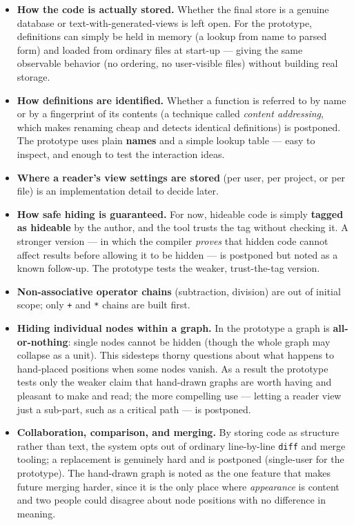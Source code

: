 \documentclass[11pt]{article}
\begin{document}
\begin{deferbox}
\begin{itemize}[leftmargin=1.4em,itemsep=4pt]
  \item \textbf{How the code is actually stored.} Whether the final store is a genuine database or text-with-generated-views is left open. For the prototype, definitions can simply be held in memory (a lookup from name to parsed form) and loaded from ordinary files at start-up --- giving the same observable behavior (no ordering, no user-visible files) without building real storage.
  \item \textbf{How definitions are identified.} Whether a function is referred to by name or by a fingerprint of its contents (a technique called \emph{content addressing}, which makes renaming cheap and detects identical definitions) is postponed. The prototype uses plain \textbf{names} and a simple lookup table --- easy to inspect, and enough to test the interaction ideas.
  \item \textbf{Where a reader's view settings are stored} (per user, per project, or per file) is an implementation detail to decide later.
  \item \textbf{How safe hiding is guaranteed.} For now, hideable code is simply \textbf{tagged as hideable} by the author, and the tool trusts the tag without checking it. A stronger version --- in which the compiler \emph{proves} that hidden code cannot affect results before allowing it to be hidden --- is postponed but noted as a known follow-up. The prototype tests the weaker, trust-the-tag version.
  \item \textbf{Non-associative operator chains} (subtraction, division) are out of initial scope; only \texttt{+} and \texttt{*} chains are built first.
  \item \textbf{Hiding individual nodes within a graph.} In the prototype a graph is \textbf{all-or-nothing}: single nodes cannot be hidden (though the whole graph may collapse as a unit). This sidesteps thorny questions about what happens to hand-placed positions when some nodes vanish. As a result the prototype tests only the weaker claim that hand-drawn graphs are worth having and pleasant to make and read; the more compelling use --- letting a reader view just a sub-part, such as a critical path --- is postponed.
  \item \textbf{Collaboration, comparison, and merging.} By storing code as structure rather than text, the system opts out of ordinary line-by-line \texttt{diff} and merge tooling; a replacement is genuinely hard and is postponed (single-user for the prototype). The hand-drawn graph is noted as the one feature that makes future merging harder, since it is the only place where \emph{appearance} is content and two people could disagree about node positions with no difference in meaning.

\end{itemize}
\end{deferbox}
\end{document}
